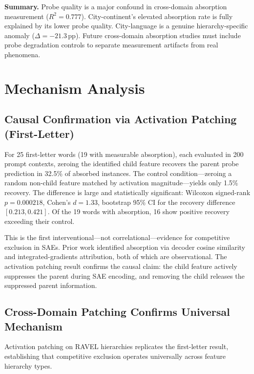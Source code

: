 \documentclass{article}
\begin{document}
\textbf{Summary.} Probe quality is a major confound in cross-domain absorption measurement ($R^2 = 0.777$). City-continent's elevated absorption rate is fully explained by its lower probe quality. City-language is a genuine hierarchy-specific anomaly ($\Delta = -21.3$\,pp). Future cross-domain absorption studies must include probe degradation controls to separate measurement artifacts from real phenomena.

\section{Mechanism Analysis}
\label{sec:mechanism}

\subsection{Causal Confirmation via Activation Patching (First-Letter)}

For 25 first-letter words (19 with measurable absorption), each evaluated in 200 prompt contexts, zeroing the identified child feature recovers the parent probe prediction in 32.5\% of absorbed instances. The control condition---zeroing a random non-child feature matched by activation magnitude---yields only 1.5\% recovery. The difference is large and statistically significant: Wilcoxon signed-rank $p = 0.000218$, Cohen's $d = 1.33$, bootstrap 95\% CI for the recovery difference $[0.213, 0.421]$. Of the 19 words with absorption, 16 show positive recovery exceeding their control.

This is the first interventional---not correlational---evidence for competitive exclusion in SAEs. Prior work \citep{chanin2024absorption} identified absorption via decoder cosine similarity and integrated-gradients attribution, both of which are observational. The activation patching result confirms the causal claim: the child feature actively suppresses the parent during SAE encoding, and removing the child releases the suppressed parent information.

\subsection{Cross-Domain Patching Confirms Universal Mechanism}

Activation patching on RAVEL hierarchies replicates the first-letter result, establishing that competitive exclusion operates universally across feature hierarchy types.
\end{document}
